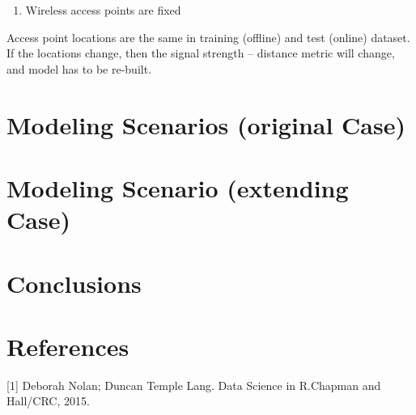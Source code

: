 \documentclass[
]{article}
\providecommand{\tightlist}{%
  \setlength{\itemsep}{0pt}\setlength{\parskip}{0pt}}
\begin{document}
\begin{enumerate}
\def\labelenumi{\arabic{enumi}.}
\setcounter{enumi}{1}
\tightlist
\item
  Wireless access points are fixed
\end{enumerate}

Access point locations are the same in training (offline) and test
(online) dataset. If the locations change, then the signal strength --
distance metric will change, and model has to be re-built.

\hypertarget{modeling-scenarios-original-case}{%
\section{Modeling Scenarios (original
Case)}\label{modeling-scenarios-original-case}}

\hypertarget{modeling-scenario-extending-case}{%
\section{Modeling Scenario (extending
Case)}\label{modeling-scenario-extending-case}}

\hypertarget{conclusions}{%
\section{Conclusions}\label{conclusions}}

\hypertarget{references}{%
\section{References}\label{references}}

\leavevmode\hypertarget{refs}{}%
{[}1{]} Deborah Nolan; Duncan Temple Lang. Data Science in R.Chapman and
Hall/CRC, 2015.
\end{document}
